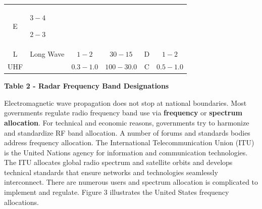 \documentclass[
]{book}
\begin{document}
\begin{longtable}[]{@{}clcccc@{}}
\begin{minipage}[t]{0.14\columnwidth}
E\strut
\end{minipage} & \begin{minipage}[t]{0.06\columnwidth}\centering
\(3-4\)

\(2-3\)\strut
\end{minipage}\tabularnewline
\begin{minipage}[t]{0.14\columnwidth}\centering
L\strut
\end{minipage} & \begin{minipage}[t]{0.25\columnwidth}\raggedright
Long Wave\strut
\end{minipage} & \begin{minipage}[t]{0.15\columnwidth}\centering
\(1-2\)\strut
\end{minipage} & \begin{minipage}[t]{0.09\columnwidth}\centering
\(30 - 15\)\strut
\end{minipage} & \begin{minipage}[t]{0.14\columnwidth}\centering
D\strut
\end{minipage} & \begin{minipage}[t]{0.06\columnwidth}\centering
\(1-2\)\strut
\end{minipage}\tabularnewline
\begin{minipage}[t]{0.14\columnwidth}\centering
UHF\strut
\end{minipage} & \begin{minipage}[t]{0.25\columnwidth}\raggedright
\strut
\end{minipage} & \begin{minipage}[t]{0.15\columnwidth}\centering
\(0.3-1.0\)\strut
\end{minipage} & \begin{minipage}[t]{0.09\columnwidth}\centering
\(100 - 30.0\)\strut
\end{minipage} & \begin{minipage}[t]{0.14\columnwidth}\centering
C\strut
\end{minipage} & \begin{minipage}[t]{0.06\columnwidth}\centering
\(0.5-1.0\)\strut
\end{minipage}\tabularnewline
\bottomrule
\end{longtable}

\textbf{Table 2 - Radar Frequency Band Designations}

Electromagnetic wave propagation does not stop at national boundaries. Most
governments regulate radio frequency band use via \textbf{frequency} or
\textbf{spectrum allocation}. For technical and economic reasons, governments try to
harmonize and standardize RF band allocation. A number of forums and standards
bodies address frequency allocation. The International Telecommunication Union
(ITU) is the United Nations agency for information and communication
technologies. The ITU allocates global radio spectrum and satellite orbits and
develops technical standards that ensure networks and technologies seamlessly
interconnect. There are numerous users and spectrum allocation is complicated to
implement and regulate. Figure 3 illustrates the United States frequency
allocations.
\end{document}
